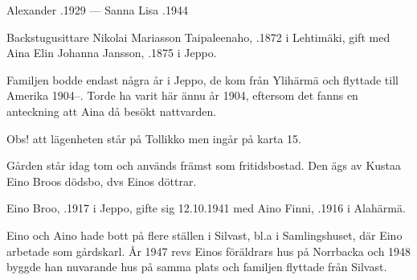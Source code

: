 Alexander .1929  ---  Sanna Lisa .1944


%
Backstugusittare Nikolai Mariasson Taipaleenaho, .1872 i Lehtimäki, gift med Aina Elin Johanna Jansson, .1875 i Jeppo.
\begin{jhchildren}
  \item {}
  \item {}
  \item {}
\end{jhchildren}

Familjen bodde endast några år i Jeppo, de kom från Ylihärmä och flyttade till Amerika 1904--. Torde ha varit här ännu år 1904, eftersom det fanns en anteckning att Aina då besökt nattvarden.



%
Obs! att lägenheten står på Tollikko men ingår på karta 15.


%
Gården står idag tom och används främst som fritidsbostad. Den ägs av Kustaa Eino Broos dödsbo, dvs Einos döttrar.\jhvspace{}



%
Eino Broo, .1917 i Jeppo, gifte sig 12.10.1941 med Aino Finni, .1916 i Alahärmä.
\begin{jhchildren}
  \item {}
  \item {}
  \item {}
  \item {}
\end{jhchildren}
Eino och Aino hade bott på flere ställen i Silvast, bl.a i Samlingshuset, där Eino arbetade som gårdskarl. År 1947 revs Einos föräldrars hus på Norrbacka och 1948 byggde han nuvarande hus på samma plats och familjen flyttade från Silvast.


